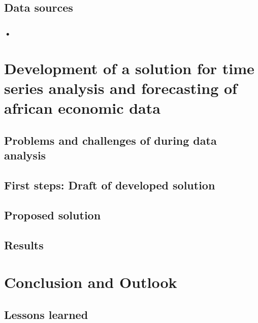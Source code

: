 \section{Data sources}\label{datasource}

\subsection{•}


\chapter{Development of a solution for time series analysis and forecasting of african economic data}\label{development}
\section{Problems and challenges of during data analysis}\label{problems_challenges}

\section{First steps: Draft of developed solution}\label{draft}

\section{Proposed solution}\label{proposed_solution}

\section{Results}\label{results}

\chapter{Conclusion and Outlook}\label{conclusion_outlook}
\section{Lessons learned}\label{lessons_learned}

